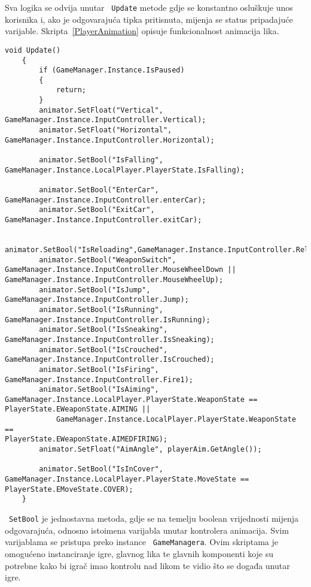 Sva logika se odvija unutar ~\texttt{Update} metode gdje se konstantno osluškuje unos
korisnika i, ako je odgovarajuća tipka pritisnuta, mijenja se status pripadajuće
varijable. 
Skripta~\ref{PlayerAnimation} opisuje funkcionalnost animacija lika.
\begin{lstlisting}[caption={Animacije lika}, label=PlayerAnimation]
 void Update()
    {
        if (GameManager.Instance.IsPaused)
        {
            return;
        }
        animator.SetFloat("Vertical", GameManager.Instance.InputController.Vertical);
        animator.SetFloat("Horizontal",
GameManager.Instance.InputController.Horizontal);

        animator.SetBool("IsFalling",
GameManager.Instance.LocalPlayer.PlayerState.IsFalling);

        animator.SetBool("EnterCar", GameManager.Instance.InputController.enterCar);
        animator.SetBool("ExitCar", GameManager.Instance.InputController.exitCar);

        animator.SetBool("IsReloading",GameManager.Instance.InputController.Reload);
        animator.SetBool("WeaponSwitch",
GameManager.Instance.InputController.MouseWheelDown ||
GameManager.Instance.InputController.MouseWheelUp);
        animator.SetBool("IsJump", GameManager.Instance.InputController.Jump);
        animator.SetBool("IsRunning", GameManager.Instance.InputController.IsRunning);
        animator.SetBool("IsSneaking",
GameManager.Instance.InputController.IsSneaking);
        animator.SetBool("IsCrouched",
GameManager.Instance.InputController.IsCrouched);
        animator.SetBool("IsFiring", GameManager.Instance.InputController.Fire1);
        animator.SetBool("IsAiming",
GameManager.Instance.LocalPlayer.PlayerState.WeaponState ==
PlayerState.EWeaponState.AIMING ||
            GameManager.Instance.LocalPlayer.PlayerState.WeaponState ==
PlayerState.EWeaponState.AIMEDFIRING);
        animator.SetFloat("AimAngle", playerAim.GetAngle());

        animator.SetBool("IsInCover",
GameManager.Instance.LocalPlayer.PlayerState.MoveState ==
PlayerState.EMoveState.COVER);
    }
\end{lstlisting}
~\texttt{SetBool} je jednostavna metoda, gdje se na temelju boolean vrijednosti mijenja
odgovarajuća, odnosno istoimena varijabla unutar kontrolera animacija. Svim
varijablama se pristupa preko instance ~\texttt{GameManagera}.
Ovim skriptama je omogućeno instanciranje igre, glavnog lika te glavnih komponenti
koje su potrebne kako bi igrač imao kontrolu nad likom te vidio što se događa unutar
igre.
